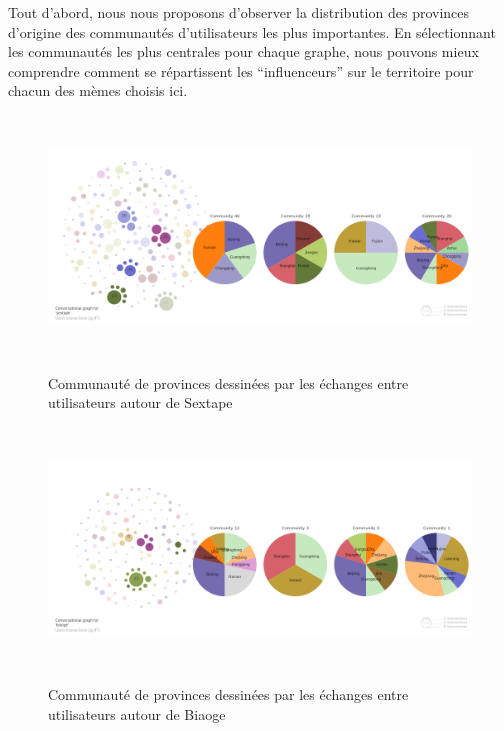 Tout d{\textquoteright}abord, nous nous proposons
d{\textquoteright}observer la distribution des provinces
d{\textquoteright}origine des communaut\'es
d{\textquoteright}utilisateurs les plus importantes. En s\'electionnant
les communaut\'es les plus centrales pour chaque graphe, nous pouvons
mieux comprendre comment se r\'epartissent les
{\textquotedblleft}influenceurs{\textquotedblright} sur le territoire
pour chacun des m\`emes choisis ici.

\begin{figure}[H]
    \centering
    \includegraphics[width=5.9996in,height=2.5004in]{figures/chap4/chapitre4-img54.png}
    \label{fig:sextape-users-pie}
    \caption{
        Communaut\'e de provinces dessin\'ees par les \'echanges entre utilisateurs autour de Sextape
    }

\end{figure}

\begin{figure}[H]
    \centering     
    \includegraphics[width=5.9996in,height=2.5004in]{figures/chap4/chapitre4-img55.png}
    \label{fig:biaoge-users-pie}
    \caption{
        Communaut\'e de provinces dessin\'ees par les \'echanges entre utilisateurs autour de Biaoge
    }
\end{figure}

 

